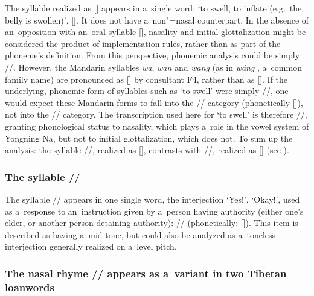 			The syllable realized as [] appears in a~single word: ‘to swell, to
			inflate (e.g.~the belly is swollen)’, []. It does not have a~non"=nasal counterpart. In
			the absence of an~opposition with an~oral syllable [], nasality and initial glottalization
			might be considered the product of implementation rules, rather than as part of the phoneme’s
			definition. From this perspective, phonemic analysis could be simply //. However, the {Mandarin}
			syllables \textit{wa}, \textit{wan} and \textit{wang} (as in \textit{wáng} , a~common family
			name) are pronounced as [] by consultant F4, rather than as []. If the underlying,
			phonemic form of syllables such as ‘to swell’ were simply //, one would expect these {Mandarin}
			forms to fall into the // category (phonetically []), not into the //
			category. The transcription used here for ‘to swell’ is therefore //, granting phonological status to
			nasality, which plays a~role in the vowel system of Yongning Na, but not to initial glottalization,
			which does not. To sum up the analysis: the syllable //, realized as [], contrasts
			with //, realized as [] (see
			).
			
			
			\subsubsection{The syllable //}
			\label{sec:thesyllable}
			
			The syllable // appears in one single word, the interjection ‘Yes!’, ‘Okay!’, used as
			a~response to an~instruction given by a~person having authority (either one’s elder, or another
			person detaining authority): // (phonetically: []). This item is described as
			having a~mid tone, but could also be analyzed as a~toneless interjection generally realized on
			a~level pitch.
			
			
			\subsubsection{The nasal rhyme // appears as a~variant in two Tibetan loanwords}
			\label{sec:thenasalrhymeappearsasavariantontwotibetanloanwords}
			

